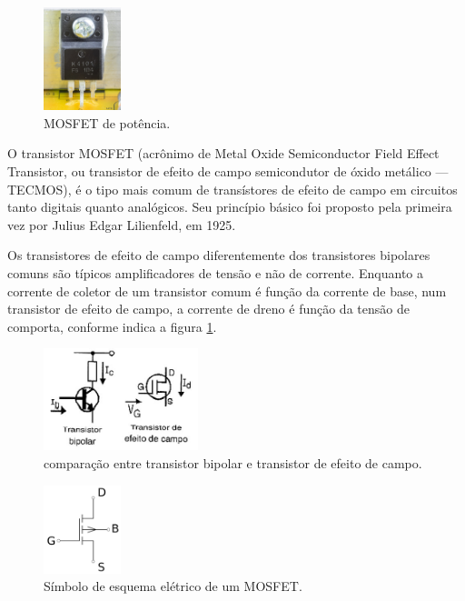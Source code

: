 \documentclass[12pt]{article}
\begin{document}
        \begin{figure}[htpb!]

            \centering
            \includegraphics[width=0.2\textwidth]{./images/Dell_Professional_P2212H_-_power_supply_board_-_K4101FS-2149.jpg}
            \caption{MOSFET de potência.}

        \end{figure}

    O transistor MOSFET (acrônimo de Metal Oxide Semiconductor Field Effect Transistor, ou transistor de efeito de campo semicondutor de óxido metálico — TECMOS), é o tipo mais comum de transístores de efeito de campo em circuitos tanto digitais quanto analógicos. Seu princípio básico foi proposto pela primeira vez por Julius Edgar Lilienfeld, em 1925.
\cite{wikipedia_mosfet_2025}

    Os transistores de efeito de campo diferentemente dos transistores bipolares comuns são típicos amplificadores de tensão e não de corrente. Enquanto a corrente de coletor de um transistor comum é função da corrente de base, num transistor de efeito de campo, a corrente de dreno é função da tensão de comporta, conforme indica a figura \ref{fig:comparacao}.

        \begin{figure}[htpb!]

            \centering
            \includegraphics[width=0.4\textwidth]{./images/transisCampo.jpg}
            \caption{comparação entre transistor bipolar e transistor de efeito de campo.}
            \label{fig:comparacao}

        \end{figure}

        \begin{figure}[htpb!]

            \centering
            \includegraphics[width=0.2\textwidth]{./images/Mosfet-wp.svg.png}
            \caption{Símbolo de esquema elétrico de um MOSFET.}

        \end{figure}
\end{document}
